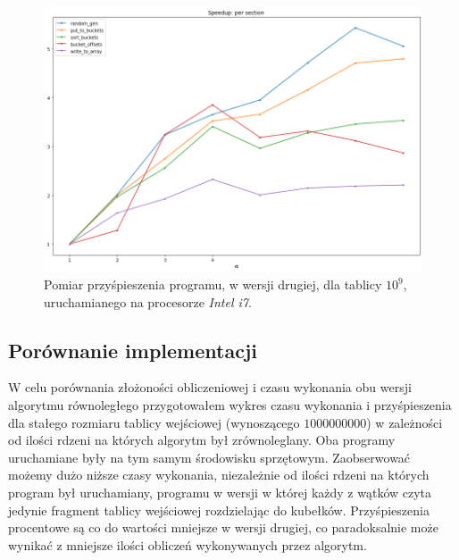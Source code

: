 \documentclass{article}
\begin{document}
        \begin{figure}[h!]
            \centering
            \includegraphics[width=15cm]{report2/images/Speedup/speedup_i7.png}        
            \caption{Pomiar przyśpieszenia programu, w wersji drugiej, dla tablicy ${10^{9}}$, uruchamianego na procesorze \textit{Intel i7}. }
        \end{figure}
    
    \newpage
    \subsection{Porównanie implementacji}
    W celu porównania złożoności obliczeniowej i czasu wykonania obu wersji algorytmu równoległego przygotowałem wykres czasu wykonania i przyśpieszenia dla stałego rozmiaru tablicy wejściowej (wynoszącego $1000 000 000$) w zależności od ilości rdzeni na których algorytm był zrównoleglany. Oba programy uruchamiane były na tym samym środowisku sprzętowym. Zaobserwować możemy dużo niższe czasy wykonania, niezależnie od ilości rdzeni na których program był uruchamiany, programu w wersji w której każdy z wątków czyta jedynie fragment tablicy wejściowej rozdzielając do kubełków. Przyśpieszenia procentowe są co do wartości mniejsze w wersji drugiej, co paradoksalnie może wynikać z mniejsze ilości obliczeń wykonywanych przez algorytm. 
    
\end{document}
